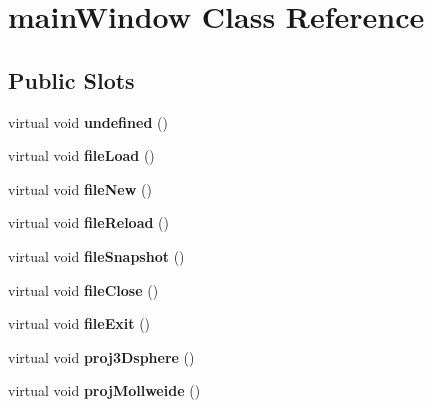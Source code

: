 \hypertarget{classmainWindow}{
\section{mainWindow Class Reference}
\label{classmainWindow}
}
\subsection*{Public Slots}
\begin{DoxyCompactItemize}
\item 
\hypertarget{classmainWindow_aa861f754c414fc8d6759efa60377fb34}{
virtual void {\bfseries undefined} ()}
\label{classmainWindow_aa861f754c414fc8d6759efa60377fb34}

\item 
\hypertarget{classmainWindow_aced9b945c1e6e9e293c8b266f61e63a0}{
virtual void {\bfseries fileLoad} ()}
\label{classmainWindow_aced9b945c1e6e9e293c8b266f61e63a0}

\item 
\hypertarget{classmainWindow_a65522ad148527031484eddb07a33bb35}{
virtual void {\bfseries fileNew} ()}
\label{classmainWindow_a65522ad148527031484eddb07a33bb35}

\item 
\hypertarget{classmainWindow_a601a449f3430825f5933997b6a79d018}{
virtual void {\bfseries fileReload} ()}
\label{classmainWindow_a601a449f3430825f5933997b6a79d018}

\item 
\hypertarget{classmainWindow_aaceda07eea906ed787ba4ecb3491772d}{
virtual void {\bfseries fileSnapshot} ()}
\label{classmainWindow_aaceda07eea906ed787ba4ecb3491772d}

\item 
\hypertarget{classmainWindow_a9c08cd415777ba11ffeedf9ba28dc7bc}{
virtual void {\bfseries fileClose} ()}
\label{classmainWindow_a9c08cd415777ba11ffeedf9ba28dc7bc}

\item 
\hypertarget{classmainWindow_a21348c589ae8725af7503e3fa9fc606f}{
virtual void {\bfseries fileExit} ()}
\label{classmainWindow_a21348c589ae8725af7503e3fa9fc606f}

\item 
\hypertarget{classmainWindow_a6a49983e560955999205dc71baa9438a}{
virtual void {\bfseries proj3Dsphere} ()}
\label{classmainWindow_a6a49983e560955999205dc71baa9438a}

\item 
\hypertarget{classmainWindow_aee96bef4bd1c9fad1d344fb2b12e7c71}{
virtual void {\bfseries projMollweide} ()}
\label{classmainWindow_aee96bef4bd1c9fad1d344fb2b12e7c71}


\end{DoxyCompactItemize}
